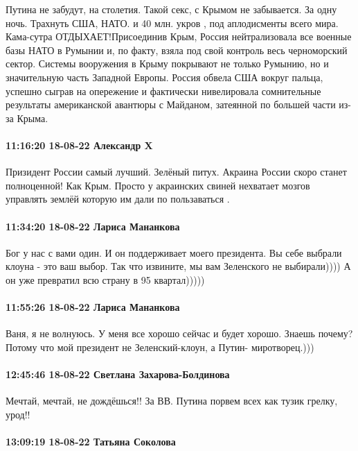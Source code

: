 Путина не забудут, на столетия. Такой секс, с Крымом не забывается. За одну
ночь. Трахнуть США, НАТО. и 40 млн. укров , под аплодисменты всего мира.
Кама-сутра ОТДЫХАЕТ!Присоединив Крым, Россия нейтрализовала все военные базы
НАТО в Румынии и, по факту, взяла под свой контроль весь черноморский сектор.
Системы вооружения в Крыму покрывают не только Румынию, но и значительную часть
Западной Европы. Россия обвела США вокруг пальца, успешно сыграв на опережение
и фактически нивелировала сомнительные результаты американской авантюры с
Майданом, затеянной по большей части из-за Крыма.

\paragraph{11:16:20 18-08-22 Александр X}

Призидент России самый лучший. Зелёный питух. Акраина России скоро станет
полноценной! Как Крым. Просто у акраинских свиней нехватает мозгов управлять
землёй которую им дали по пользаваться .

\paragraph{11:34:20 18-08-22 Лариса Мананкова}

Бог у нас с вами один. И он поддерживает моего президента. Вы себе выбрали
клоуна - это ваш выбор. Так что извините, мы вам Зеленского не выбирали)))) А
он уже превратил всю страну в 95 квартал)))))

\paragraph{11:55:26 18-08-22 Лариса Мананкова}

Ваня, я не волнуюсь. У меня все хорошо сейчас и будет хорошо. Знаешь почему?
Потому что мой президент не Зеленский-клоун, а Путин- миротворец.)))

\paragraph{12:45:46 18-08-22 Светлана Захарова-Болдинова}

Мечтай, мечтай, не дождёшься!! За ВВ. Путина порвем всех как тузик грелку,
урод!!

\paragraph{13:09:19 18-08-22 Татьяна Соколова}

